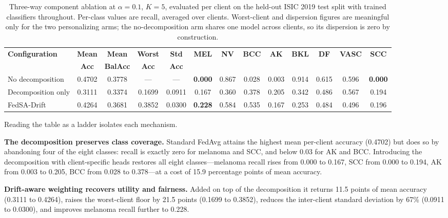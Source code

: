 \documentclass[utf8]{FrontiersinHarvard} %
\newcommand{\sadrift}{FedSA-Drift}
\begin{document}
\begin{table}[t]
\centering
\caption[Three-way component ablation at alpha=0.1]{Three-way component ablation at $\alpha{=}0.1$, $K{=}5$, evaluated per client on the held-out ISIC 2019 test split with trained classifiers throughout. Per-class values are recall, averaged over clients. Worst-client and dispersion figures are meaningful only for the two personalizing arms; the no-decomposition arm shares one model across clients, so its dispersion is zero by construction.}
\label{tab:threeway}
\footnotesize
\setlength{\tabcolsep}{3pt}
\begin{tabular}{lcccc|cccccccc}
\hline
\textbf{Configuration} & \textbf{Mean} & \textbf{Mean} & \textbf{Worst} & \textbf{Std} & \textbf{MEL} & \textbf{NV} & \textbf{BCC} & \textbf{AK} & \textbf{BKL} & \textbf{DF} & \textbf{VASC} & \textbf{SCC} \\
 & \textbf{Acc} & \textbf{BalAcc} & \textbf{Acc} & \textbf{Acc} & & & & & & & & \\
\hline
No decomposition   & 0.4702 & 0.3778 & --- & --- & \textbf{0.000} & 0.867 & 0.028 & 0.003 & 0.914 & 0.615 & 0.596 & \textbf{0.000} \\
Decomposition only & 0.3111 & 0.3374 & 0.1699 & 0.0911 & 0.167 & 0.360 & 0.378 & 0.205 & 0.342 & 0.486 & 0.567 & 0.194 \\
\sadrift{}         & 0.4264 & 0.3681 & 0.3852 & 0.0300 & \textbf{0.228} & 0.584 & 0.535 & 0.167 & 0.253 & 0.484 & 0.496 & 0.196 \\
\hline
\end{tabular}
\end{table}

Reading the table as a ladder isolates each mechanism.

\textbf{The decomposition preserves class coverage.} Standard FedAvg attains the highest mean per-client accuracy (0.4702) but does so by abandoning four of the eight classes: recall is exactly zero for melanoma and SCC, and below 0.03 for AK and BCC. Introducing the decomposition with client-specific heads restores all eight classes---melanoma recall rises from 0.000 to 0.167, SCC from 0.000 to 0.194, AK from 0.003 to 0.205, BCC from 0.028 to 0.378---at a cost of 15.9 percentage points of mean accuracy.

\textbf{Drift-aware weighting recovers utility and fairness.} Added on top of the decomposition it returns 11.5 points of mean accuracy (0.3111 to 0.4264), raises the worst-client floor by 21.5 points (0.1699 to 0.3852), reduces the inter-client standard deviation by 67\% (0.0911 to 0.0300), and improves melanoma recall further to 0.228.
\end{document}
